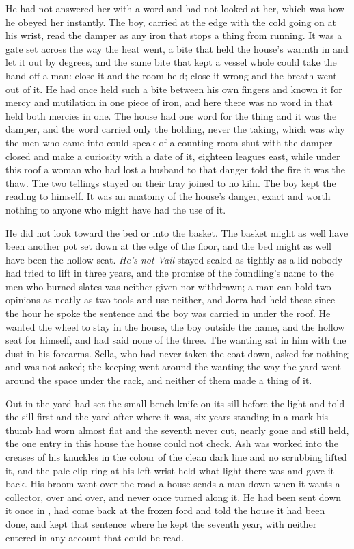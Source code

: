 He had not answered her with a word and had not looked at her, which was how he obeyed her instantly. The boy, carried at the edge with the cold going on at his wrist, read the damper as any iron that stops a thing from running. It was a gate set across the way the heat went, a bite that held the house's warmth in and let it out by degrees, and the same bite that kept a vessel whole could take the hand off a man: close it and the room held; close it wrong and the breath went out of it. He had once held such a bite between his own fingers and known it for mercy and mutilation in one piece of iron, and here there was no word in  that held both mercies in one. The house had one word for the thing and it was the damper, and the word carried only the holding, never the taking, which was why the men who came into  could speak of a counting room shut with the damper closed and make a curiosity with a date of it, eighteen leagues east, while under this roof a woman who had lost a husband to that danger told the fire it was the thaw. The two tellings stayed on their tray joined to no kiln. The boy kept the reading to himself. It was an anatomy of the house's danger, exact and worth nothing to anyone who might have had the use of it.

He did not look toward the bed or into the basket. The basket might as well have been another pot set down at the edge of the floor, and the bed might as well have been the hollow seat. \emph{He's not Vail} stayed sealed as tightly as a lid nobody had tried to lift in three years, and the promise of the foundling's name to the men who burned slates was neither given nor withdrawn; a man can hold two opinions as neatly as two tools and use neither, and Jorra had held these since the hour he spoke the sentence and the boy was carried in under the roof. He wanted the wheel to stay in the house, the boy outside the name, and the hollow seat for himself, and had said none of the three. The wanting sat in him with the dust in his forearms. Sella, who had never taken the coat down, asked for nothing and was not asked; the keeping went around the wanting the way the yard went around the space under the rack, and neither of them made a thing of it.

\scenebreak

Out in the yard  had set the small bench knife on its sill before the light and told the sill first and the yard after where it was, six years standing in a mark his thumb had worn almost flat and the seventh never cut, nearly gone and still held, the one entry in this house the house could not check. Ash was worked into the creases of his knuckles in the colour of the clean dark line and no scrubbing lifted it, and the pale clip-ring at his left wrist held what light there was and gave it back. His broom went over the road a house sends a man down when it wants a collector, over and over, and never once turned along it. He had been sent down it once in , had come back at the frozen ford and told the house it had been done, and kept that sentence where he kept the seventh year, with neither entered in any account that could be read.

